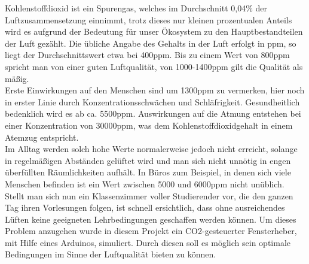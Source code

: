 
\label{Einleitung}
Kohlenstoffdioxid ist ein Spurengas, welches im Durchschnitt 0,04$\percent$ der Luftzusammensetzung einnimmt, trotz dieses nur kleinen prozentualen Anteils wird es aufgrund der Bedeutung für unser Ökosystem zu den Hauptbestandteilen der Luft gezählt. \cite[vgl.]{Wikipedia.} Die übliche Angabe des Gehalts in der Luft erfolgt in ppm, so liegt der Durchschnittswert etwa bei 400ppm. Bis zu einem Wert von 800ppm spricht man von einer guten Luftqualität, von 1000-1400ppm gilt die Qualität als mäßig. \cite[vgl.]{.CiKSOLUTIONS} \\
Erste Einwirkungen auf den Menschen sind um 1300ppm zu vermerken, hier noch in erster Linie durch Konzentrationsschwächen und Schläfrigkeit. Gesundheitlich bedenklich wird es ab ca. 5500ppm. Auswirkungen auf die Atmung entstehen bei einer Konzentration von 30000ppm, was dem Kohlenstoffdioxidgehalt in einem Atemzug entspricht. \cite[vgl. S. 1364]{Umweltbundesamt.2017} \\
Im Alltag werden solch hohe Werte normalerweise jedoch nicht erreicht, solange in regelmäßigen Abständen gelüftet wird und man sich nicht unnötig in engen überfüllten Räumlichkeiten aufhält. In Büros zum Beispiel, in denen sich viele Menschen befinden ist ein Wert zwischen 5000 und 6000ppm nicht unüblich. \cite [vgl. S. 1364]{Umweltbundesamt.2017} \\
Stellt man sich nun ein Klassenzimmer voller Studierender vor, die den ganzen Tag ihren Vorlesungen folgen, ist schnell ersichtlich, dass ohne ausreichendes Lüften keine geeigneten Lehrbedingungen geschaffen werden können. Um dieses Problem anzugehen wurde in diesem Projekt ein CO2-gesteuerter Fensterheber, mit Hilfe eines Arduinos, simuliert. Durch diesen soll es möglich sein optimale Bedingungen im Sinne der Luftqualität bieten zu können. \\